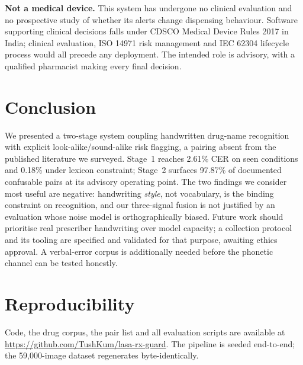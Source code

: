\documentclass[conference]{IEEEtran}
\begin{document}
\textbf{Not a medical device.} This system has undergone no clinical evaluation
and no prospective study of whether its alerts change dispensing behaviour.
Software supporting clinical decisions falls under CDSCO Medical Device Rules
2017 in India; clinical evaluation, ISO 14971 risk management and IEC 62304
lifecycle process would all precede any deployment. The intended role is
advisory, with a qualified pharmacist making every final decision.

\section{Conclusion}
We presented a two-stage system coupling handwritten drug-name recognition with
explicit look-alike/sound-alike risk flagging, a pairing absent from the
published literature we surveyed. Stage~1 reaches 2.61\% CER on seen conditions and 0.18\% under lexicon constraint; Stage~2 surfaces 97.87\% of documented
confusable pairs at its advisory operating point. The two findings we consider
most useful are negative: handwriting \emph{style}, not vocabulary, is the
binding constraint on recognition, and our three-signal fusion is not justified
by an evaluation whose noise model is orthographically biased. Future work should prioritise real prescriber handwriting over model capacity;
a collection protocol and its tooling are specified and validated for that
purpose, awaiting ethics approval. A verbal-error corpus is additionally needed
before the phonetic channel can be tested honestly.

\section*{Reproducibility}
Code, the drug corpus, the pair list and all evaluation scripts are available at
\url{https://github.com/TushKum/lasa-rx-guard}. The pipeline is seeded
end-to-end; the 59{,}000-image dataset regenerates byte-identically.



\end{document}
